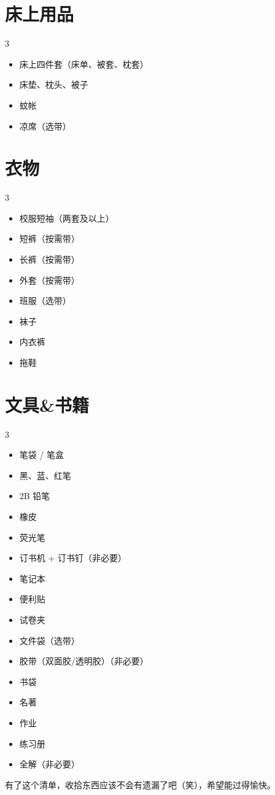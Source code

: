 \section*{床上用品}
\begin{multicols}{3}
\begin{itemize}
    \item 床上四件套（床单、被套、枕套）
    \item 床垫、枕头、被子
    \item 蚊帐
    \item 凉席（选带）
\end{itemize}
\end{multicols}

\section*{衣物}
\begin{multicols}{3}
\begin{itemize}
    \item 校服短袖（两套及以上）
    \item 短裤（按需带）
    \item 长裤（按需带）
    \item 外套（按需带）
    \item 班服（选带）
    \item 袜子
    \item 内衣裤
    \item 拖鞋
\end{itemize}
\end{multicols}

\section*{文具\&书籍}
\begin{multicols}{3}
\begin{itemize}
    \item 笔袋 / 笔盒
    \item 黑、蓝、红笔
    \item 2B 铅笔
    \item 橡皮
    \item 荧光笔
    \item 订书机 + 订书钉（非必要）
    \item 笔记本
    \item 便利贴
    \item 试卷夹
    \item 文件袋（选带）
    \item 胶带（双面胶/透明胶）（非必要）
    \item 书袋
    \item 名著
    \item 作业
    \item 练习册
    \item 全解（非必要）
\end{itemize}
\end{multicols}

有了这个清单，收拾东西应该不会有遗漏了吧（笑），希望能过得愉快。

